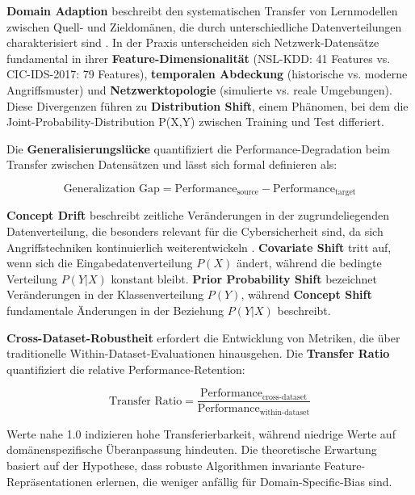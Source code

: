 \documentclass[11pt,a4paper]{article}
\begin{document}
    \textbf{Domain Adaption} beschreibt den systematischen Transfer von Lernmodellen zwischen Quell- und Zieldomänen, die durch unterschiedliche Datenverteilungen charakterisiert sind \parencite{Goodfellow2016}. In der Praxis unterscheiden sich Netzwerk-Datensätze fundamental in ihrer \textbf{Feature-Dimensionalität} (NSL-KDD: 41 Features vs. CIC-IDS-2017: 79 Features), \textbf{temporalen Abdeckung} (historische vs. moderne Angriffsmuster) und \textbf{Netzwerktopologie} (simulierte vs. reale Umgebungen). Diese Divergenzen führen zu \textbf{Distribution Shift}, einem Phänomen, bei dem die Joint-Probability-Distribution P(X,Y) zwischen Training und Test differiert.

    Die \textbf{Generalisierungslücke} quantifiziert die Performance-Degradation beim Transfer zwischen Datensätzen und lässt sich formal definieren als:

    \begin{equation}
        \text{Generalization Gap} = \text{Performance}_{\text{source}} - \text{Performance}_{\text{target}}
    \end{equation}

    \textbf{Concept Drift} beschreibt zeitliche Veränderungen in der zugrundeliegenden Datenverteilung, die besonders relevant für die Cybersicherheit sind, da sich Angriffstechniken kontinuierlich weiterentwickeln \parencite{Ring2019}. \textbf{Covariate Shift} tritt auf, wenn sich die Eingabedatenverteilung $P(X)$ ändert, während die bedingte Verteilung $P(Y|X)$ konstant bleibt. \textbf{Prior Probability Shift} bezeichnet Veränderungen in der Klassenverteilung $P(Y)$, während \textbf{Concept Shift} fundamentale Änderungen in der Beziehung $P(Y|X)$ beschreibt.

    \textbf{Cross-Dataset-Robustheit} erfordert die Entwicklung von Metriken, die über traditionelle Within-Dataset-Evaluationen hinausgehen. Die \textbf{Transfer Ratio} quantifiziert die relative Performance-Retention:

    \begin{equation}
        \text{Transfer Ratio} = \frac{\text{Performance}_{\text{cross-dataset}}}{\text{Performance}_{\text{within-dataset}}}
    \end{equation}

    Werte nahe 1.0 indizieren hohe Transferierbarkeit, während niedrige Werte auf domänenspezifische Überanpassung hindeuten. Die theoretische Erwartung basiert auf der Hypothese, dass robuste Algorithmen invariante Feature-Repräsentationen erlernen, die weniger anfällig für Domain-Specific-Bias sind.
\end{document}
